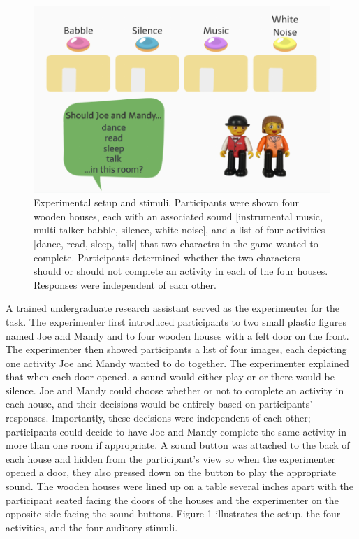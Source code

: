 \documentclass[10pt, letterpaper]{article}
\newenvironment{CodeChunk}{}{}
\begin{document}
\begin{CodeChunk}
\begin{figure}[t]

{\centering \includegraphics{figs/e3-stimuli-1} 

}

\caption[Experimental setup and stimuli]{Experimental setup and stimuli. Participants were shown four wooden houses, each with an associated sound [instrumental music, multi-talker babble, silence, white noise], and a list of four activities [dance, read, sleep, talk] that two charactrs in the game wanted to complete. Participants determined whether the two characters should or should not complete an activity in each of the four houses. Responses were independent of each other.}\label{fig:e3-stimuli}
\end{figure}
\end{CodeChunk}

A trained undergraduate research assistant served as the experimenter
for the task. The experimenter first introduced participants to two
small plastic figures named Joe and Mandy and to four wooden houses with
a felt door on the front. The experimenter then showed participants a
list of four images, each depicting one activity Joe and Mandy wanted to
do together. The experimenter explained that when each door opened, a
sound would either play or or there would be silence. Joe and Mandy
could choose whether or not to complete an activity in each house, and
their decisions would be entirely based on participants' responses.
Importantly, these decisions were independent of each other;
participants could decide to have Joe and Mandy complete the same
activity in more than one room if appropriate. A sound button was
attached to the back of each house and hidden from the participant's
view so when the experimenter opened a door, they also pressed down on
the button to play the appropriate sound. The wooden houses were lined
up on a table several inches apart with the participant seated facing
the doors of the houses and the experimenter on the opposite side facing
the sound buttons. Figure 1 illustrates the setup, the four activities,
and the four auditory stimuli.
\end{document}
